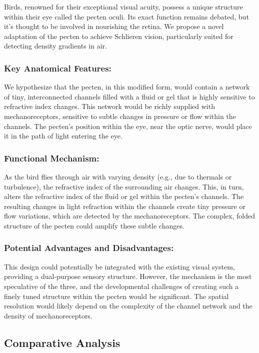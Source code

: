 \documentclass[11pt]{article}
\begin{document}
Birds, renowned for their exceptional visual acuity, possess a unique structure within their eye called the pecten oculi. Its exact function remains debated, but it's thought to be involved in nourishing the retina. We propose a novel adaptation of the pecten to achieve Schlieren vision, particularly suited for detecting density gradients in air.

\subsubsection{Key Anatomical Features:}
We hypothesize that the pecten, in this modified form, would contain a network of tiny, interconnected channels filled with a fluid or gel that is highly sensitive to refractive index changes. This network would be richly supplied with mechanoreceptors, sensitive to subtle changes in pressure or flow within the channels. The pecten's position within the eye, near the optic nerve, would place it in the path of light entering the eye.

\subsubsection{Functional Mechanism:}
As the bird flies through air with varying density (e.g., due to thermals or turbulence), the refractive index of the surrounding air changes. This, in turn, alters the refractive index of the fluid or gel within the pecten's channels. The resulting changes in light refraction within the channels create tiny pressure or flow variations, which are detected by the mechanoreceptors. The complex, folded structure of the pecten could amplify these subtle changes.

\subsubsection{Potential Advantages and Disadvantages:}
This design could potentially be integrated with the existing visual system, providing a dual-purpose sensory structure. However, the mechanism is the most speculative of the three, and the developmental challenges of creating such a finely tuned structure within the pecten would be significant. The spatial resolution would likely depend on the complexity of the channel network and the density of mechanoreceptors.

\subsection{Comparative Analysis}
\end{document}
